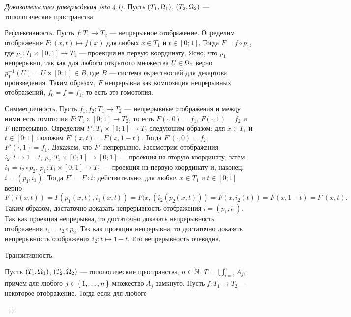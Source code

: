 \documentclass[main]{subfiles}
\begin{document}
\begin{proof}[Доказательство утверждения \ref{sta.4.1}]
	Пусть $ (T_1, \Omega_1) $, $ (T_2, \Omega_2) $ --- топологические пространства.
	\begin{phased}
		\item[Рефлексивность.] Пусть $ f \colon T_1 \to T_2 $ --- непрерывное отображение. Определим отображение
			$ F \colon (x, t) \mapsto f(x) $ для любых $ x \in T_1 $ и $ t \in [0; 1] $. Тогда $ F = f \circ p_1 $,
			где $ p_1 \colon T_1 \times [0; 1] \to T_1 $ --- проекция на первую координату. Ясно, что $ p_1 $
			непрерывно, так как для любого открытого множества $ U \in \Omega_1 $ верно
			$ p_1^{-1}(U) = U \times [0; 1] \in B $, где $ B $ --- система окрестностей для декартова произведения.
			Таким образом, $ F $ непрерывна как композиция непрерывных отображений, $ f_0 = f = f_1 $, то есть это
			гомотопия.
		\item[Симметричность.] Пусть $ f_1, f_2 \colon T_1 \to T_2 $ --- непрерывные отображения и между ними есть
			гомотопия $ F \colon T_1 \times [0; 1] \to T_2 $, то есть $ F(\cdot, 0) = f_1 $,
			$ F(\cdot, 1) = f_2 $ и $ F $ непрерывно. Определим $ F' \colon T_1 \times [0; 1] \to T_2 $
			следующим образом: для $ x \in T_1 $ и $ t \in [0; 1] $ положим $ F'(x, t) = F(x, 1 - t) $.
			Тогда $ F'( \cdot, 0) = f_2 $, $ F'( \cdot, 1) = f_1 $. Докажем, что $ F' $ непрерывно.
			Рассмотрим отображения $ i_2 \colon t \mapsto 1 - t $, $ p_2 \colon T_1 \times [0; 1] \to [0; 1] $ ---
			проекция на вторую координату, затем $ i_1 = i_2 \circ p_2 $, $ p_1 \colon T_1 \times [0; 1] \to T_1 $ ---
			проекция на первую координату и, наконец, $ i = (p_1, i_1 )$. Тогда $ F' = F \circ i $: действительно,
			для любых $ x \in T_1 $ и $ t \in [0; 1] $ верно
				\[ F(i(x, t)) = F(p_1(x, t), i_1(x, t)) = F(x, (i_2(p_2(x, t))) =
				F(x, i_2(t)) = F(x, 1 - t) = F'(x, t). \]
			Таким образом, достаточно доказать непрерывность отображения $ i = (p_1, i_1) $. Так как проекция
			непрерывна, то достаточно доказать непрерывность отображения $ i_1 = i_2 \circ p_2 $. Так как проекция
			непрерывна, то достаточно доказать непрерывность отображения $ i_2 \colon t \mapsto 1 - t $. Его
			непрерывность очевидна.
		\item[Транзитивность.]
			\begin{lemma} \label{lem.4.1}
				Пусть $ (T_1, \Omega_1) $, $ (T_2, \Omega_2) $ --- топологические пространства, $ n \in \mathbb{N} $,
				$ T = \bigcup_{j = 1}^{n} A_j $, причем для любого $ j \in \left\{\,1, \ldots, n\,\right\} $ множество $ A_j $
				замкнуто. Пусть $ f \colon T_1 \to T_2 $ --- некоторое отображение. Тогда если для любого

\end{lemma}
\end{phased}
\end{proof}
\end{document}
